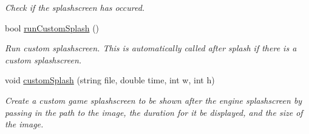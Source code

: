 \begin{DoxyCompactItemize}
\begin{DoxyCompactList}\small\item\em Check if the splashscreen has occured. \end{DoxyCompactList}\item 
bool \hyperlink{classEngine_a5c87c90c9dd6b3fd652e24af0c7e935d}{run\+Custom\+Splash} ()\hypertarget{classEngine_a5c87c90c9dd6b3fd652e24af0c7e935d}{}\label{classEngine_a5c87c90c9dd6b3fd652e24af0c7e935d}

\begin{DoxyCompactList}\small\item\em Run custom splashscreen. This is automatically called after splash if there is a custom splashscreen. \end{DoxyCompactList}\item 
void \hyperlink{classEngine_a0960e415d0b9ed92099eee6677d7ea51}{custom\+Splash} (string file, double time, int w, int h)\hypertarget{classEngine_a0960e415d0b9ed92099eee6677d7ea51}{}\label{classEngine_a0960e415d0b9ed92099eee6677d7ea51}

\begin{DoxyCompactList}\small\item\em Create a custom game splashscreen to be shown after the engine splashscreen by passing in the path to the image, the duration for it be displayed, and the size of the image. \end{DoxyCompactList}\end{DoxyCompactItemize}
